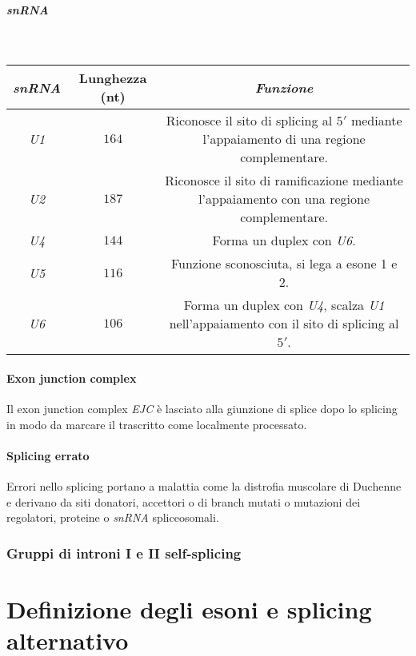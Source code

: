\subparagraph{\emph{snRNA}}\mbox{}\\
\begin{center}
\begin{tabular}{|c|c|c|}
	\hline
	\emph{\textbf{snRNA}} & \textbf{Lunghezza (nt)} & \emph{Funzione}\\
	\hline
	\emph{U1} & $164$ & \makecell{Riconosce il sito di splicing al $5'$ mediante \\l'appaiamento di una regione complementare.} \\
	\hline
	\emph{U2} & $187$ & \makecell{Riconosce il sito di ramificazione mediante \\l'appaiamento con una regione complementare.}\\
	\hline
	\emph{U4} & $144$ & Forma un duplex con \emph{U6}.\\
	\hline
	\emph{U5} & $116$ & Funzione sconosciuta, si lega a esone 1 e 2.\\
	\hline
	\emph{U6} & $106$ & \makecell{Forma un duplex con \emph{U4}, scalza \emph{U1} \\nell'appaiamento con il sito di splicing al $5'$.}\\
	\hline
\end{tabular}
\end{center}
\paragraph{Exon junction complex}
Il exon junction complex \emph{EJC} \`e lasciato alla giunzione di splice dopo lo splicing in modo da marcare il trascritto come localmente processato. 
\paragraph{Splicing errato}
Errori nello splicing portano a malattia come la distrofia muscolare di Duchenne e derivano da siti donatori, accettori o di branch mutati o mutazioni dei regolatori, proteine o 
\emph{snRNA} spliceosomali. 
\subsubsection{Gruppi di introni I e II self-splicing}

\section{Definizione degli esoni e splicing alternativo}

